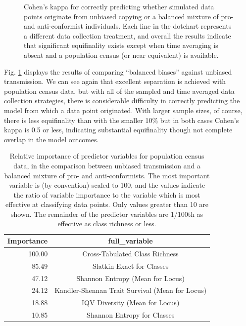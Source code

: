 \begin{figure}[h]
\caption{Cohen's kappa for correctly predicting whether simulated data points originate from unbiased copying or a balanced mixture of pro- and anti-conformist individuals.  Each line in the dotchart represents a different data collection treatment, and overall the results indicate that significant equifinality exists except when time averaging is absent and a population census (or near equivalent) is available.}
\label{fig5}
\end{figure}

Fig. \ref{fig5} displays the results of comparing ``balanced biases'' against unbiased transmission.  We can see again that excellent separation is achieved with population census data, but with all of the sampled and time averaged data collection strategies, there is considerable difficulty in correctly predicting the model from which a data point originated.  With larger sample sizes, of course, there is less equifinality than with the smaller 10\% but in both cases Cohen's kappa is 0.5 or less, indicating substantial equifinality though not complete overlap in the model outcomes.  

\begin{table}[ht]
\begin{tabular}{rc}
  \hline
Importance & full\_variable \\
  \hline
100.00 & Cross-Tabulated Class Richness \\
  85.49 & Slatkin Exact for Classes \\
  47.12 & Shannon Entropy (Mean for Locus) \\
  24.12 & Kandler-Shennan Trait Survival (Mean for Locus) \\
  18.88 & IQV Diversity (Mean for Locus) \\
  10.85 & Shannon Entropy for Classes \\   
  \hline
\end{tabular}
\caption{Relative importance of predictor variables for population census data, in the comparison between unbiased transmission and a balanced mixture of pro- and anti-conformists.  The most important variable is (by convention) scaled to 100, and the values indicate the ratio of variable importance to the variable which is most effective at classifying data points. Only values greater than 10 are shown. The remainder of the predictor variables are 1/100th as effective as class richness or less.}
\label{tab:varimp-balbiased-census}
\end{table}

